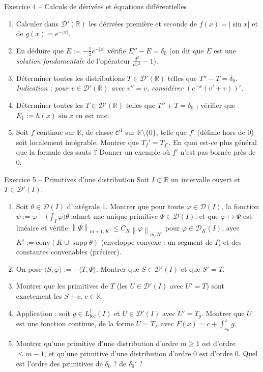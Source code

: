 \documentclass[11pt,a4paper]{article}
\newcommand{\R}{\mathbb{R}}
\newcommand{\K}{\mathbb{K}}
\newcommand{\norm}[1]{\left\|#1\right\|}
\DeclareMathOperator{\supp}{supp}
\newcommand{\D}{\mathcal{D}}
\theoremstyle{definition}
\begin{document}
\begin{exo}{Exercice 4 -- Calculs de dérivées et équations différentielles}
\begin{enumerate}[label=(\alph*)]
  \item Calculer dans $\D'(\R)$ les dérivées première et seconde de $f(x)=|\sin x|$ et de $g(x)=e^{-|x|}$.
  \item En déduire que $E:=-\frac12e^{-|x|}$ vérifie $E''-E=\delta_0$ (on dit que $E$ est une \emph{solution fondamentale} de l'opérateur $\frac{d^2}{dx^2}-1$).
  \item Déterminer toutes les distributions $T\in\D'(\R)$ telles que $T''-T=\delta_0$. \emph{Indication : pour $v\in\D'(\R)$ avec $v''=v$, considérer $(e^{-x}(v'+v))'$.}
  \item Déterminer toutes les $T\in\D'(\R)$ telles que $T''+T=\delta_0$ ; vérifier que $E_1:=h(x)\sin x$ en est une.
  \item Soit $f$ continue sur $\R$, de classe $\mathcal C^1$ sur $\R\setminus\{0\}$, telle que $f'$ (définie hors de $0$) soit localement intégrable. Montrer que $T_f'=T_{f'}$. En quoi est-ce plus général que la formule des sauts ? Donner un exemple où $f'$ n'est pas bornée près de $0$.
\end{enumerate}
\end{exo}

\begin{exo}{Exercice 5 -- Primitives d'une distribution}
Soit $I\subset\R$ un intervalle ouvert et $T\in\D'(I)$.
\begin{enumerate}[label=(\alph*)]
  \item Soit $\theta\in\D(I)$ d'intégrale $1$. Montrer que pour toute $\varphi\in\D(I)$, la fonction $\psi:=\varphi-\big(\int_I\varphi\big)\theta$ admet une unique primitive $\Psi\in\D(I)$, et que $\varphi\mapsto\Psi$ est linéaire et vérifie $\norm\Psi_{m+1,K'}\le C_K\norm\varphi_{m,K'}$ pour $\varphi\in\D_K(I)$, avec $K':=\mathrm{conv}(K\cup\supp\theta)$ (enveloppe convexe : un segment de $I$) et des constantes convenables (préciser).
  \item On pose $\langle S,\varphi\rangle:=-\langle T,\Psi\rangle$. Montrer que $S\in\D'(I)$ et que $S'=T$.
  \item Montrer que les primitives de $T$ (les $U\in\D'(I)$ avec $U'=T$) sont exactement les $S+c$, $c\in\K$.
  \item Application : soit $g\in L^1_{\mathrm{loc}}(I)$ et $U\in\D'(I)$ avec $U'=T_g$. Montrer que $U$ est une fonction continue, de la forme $U=T_F$ avec $F(x)=c+\int_{x_0}^xg$.
  \item Montrer qu'une primitive d'une distribution d'ordre $m\ge1$ est d'ordre $\le m-1$, et qu'une primitive d'une distribution d'ordre $0$ est d'ordre $0$. Quel est l'ordre des primitives de $\delta_0$ ? de $\delta_0'$ ?
\end{enumerate}
\end{exo}
\end{document}
